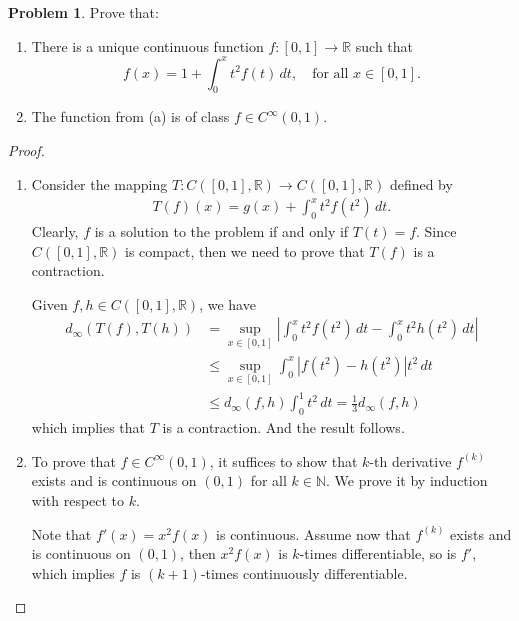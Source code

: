 \documentclass[11pt]{article}
\theoremstyle{definition}
\newtheorem{problem}{Problem}
\theoremstyle{definition}
\begin{document}
\medskip

\begin{problem}
Prove that:
\begin{enumerate}[label=(\alph*)]
    \item There is a unique continuous function $f:[0,1]\to\mathbb{R}$ such that
    $$
    f(x)=1+\int_0^x t^2f(t)\, dt,
    \quad \text{for all $x\in [0,1]$.}
    $$
    \item The function from (a) is of class $f\in C^\infty(0,1)$.
\end{enumerate}
\end{problem}

\begin{proof}
~\begin{enumerate}[label=(\alph*)]
    \item Consider the mapping $T: C([0,1],\mathbb{R})\to C([0,1],\mathbb{R})$ defined by 
    \begin{align*}
        T(f)(x) = g(x) + \int^x_0 t^2 f(t^2)\, dt.
    \end{align*}
    Clearly, $f$ is a solution to the problem if and only if $T(t) = f$. Since $C([0,1],\mathbb{R})$ is compact, then we need to prove that $T(f)$ is a contraction.
    
    Given $f,h \in C([0,1],\mathbb{R})$, we have
    \begin{align*}
        d_\infty(T(f),T(h)) & = \sup_{x\in[0,1]} \left|\int^x_0 t^2 f(t^2)\, dt - \int^x_0 t^2 h(t^2)\, dt\right| \\
        & \leq \sup_{x\in[0,1]} \int^x_0 \left|f(t^2) - h(t^2)\right|t^2\, dt \\
        & \leq d_\infty (f,h) \int^1_0 t^2\, dt = \frac{1}{3} d_\infty (f,h)
    \end{align*}
    which implies that $T$ is a contraction. And the result follows.
    
    \item To prove that $f \in C^\infty(0,1)$, it suffices to show that $k$-th derivative $f^{(k)}$ exists and is continuous on $(0,1)$ for all $k \in \mathbb{N}$. We prove it by induction with respect to $k$.
    
    Note that $f'(x) = x^2 f(x)$ is continuous. Assume now that $f^{(k)}$ exists and is continuous on $(0,1)$, then $x^2f(x)$ is $k$-times differentiable, so is $f'$, which implies $f$ is $(k+1)$-times continuously differentiable.
\end{enumerate}
\end{proof}
\end{document}
